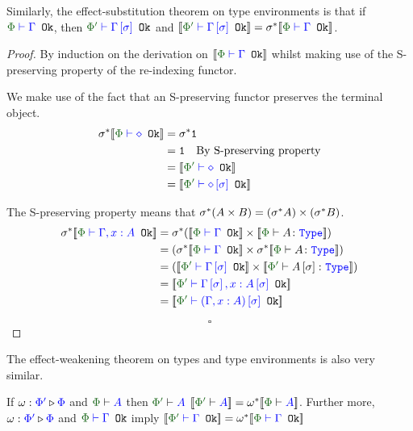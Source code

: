 \documentclass{Report}
\begin{document}
\begin{theorem}
    Similarly, the effect-substitution theorem on type environments is that if $\wellformedok{\P}{\G}$, then $\wellformedok{\P'}{\G\ssi}$ and $\deno{\wellformedok{\P'}{\G\ssi}} = \si\star\deno{\wellformedok{\P}{\G}}$.
\end{theorem}

\begin{proof}
    By induction on the derivation on $\deno{\wellformedok{\P}{\G}}$ whilst making use of the S-preserving property of the re-indexing functor.

    We make use of the fact that an S-preserving functor preserves the terminal object.
    \begin{align*}
        \si\star\deno{\wellformedok{\P}{\nil}} &=\si\star\1\\
        & = \1\qt{By S-preserving property}\\
        &= \deno{\wellformedok{\P'}{\nil}}\\
        &= \deno{\wellformedok{\P'}{\nil\ssi}}\\
    \end{align*}
    
    The S-preserving property means that $\sigma^*(A \times B) = (\sigma^* A)\times (\sigma^* B)$.
    \begin{align*}
       \si\star\deno{\wellformedok{\P}{\gax}} &= \si\star(\deno{\wellformedok{\P}{\G}} \times \deno{\typerelation{\P}{A}{\type}}) \\
       & = (\si\star\deno{\wellformedok{\P}{\G}} \times \si\star\deno{\typerelation{\P}{A}{\type}})\\
        & = (\deno{\wellformedok{\P'}{\G\ssi}} \times \deno{\typerelation{\P'}{A\ssi}{\type}})\\
        & = \deno{\wellformedok{\P'}{\G\ssi, x: A\ssi}}\\
        & = \deno{\wellformedok{\P'}{(\gax)\ssi}}\\
    \end{align*}

    $$\square$$
\end{proof}


The effect-weakening theorem on types and type environments is also very similar.

\begin{theorem}
    If $\omega : {\color{blue}\Phi'} \triangleright {\color {blue} \Phi}$ and $\wellformed{\P}{A}$ then $\wellformed{\P'}{A}$ $\deno{\wellformed{\P'}{A}} = \w\star\deno{\wellformed{\P}{A}}$. Further more, $\omega : {\color{blue}\Phi'} \triangleright {\color {blue} \Phi}$ and $\wellformedok{\P}{\G}$ imply $\deno{\wellformedok{\P'}{\G}} = \w\star\deno{\wellformedok{\P}{\G}}$
\end{theorem}
\end{document}

